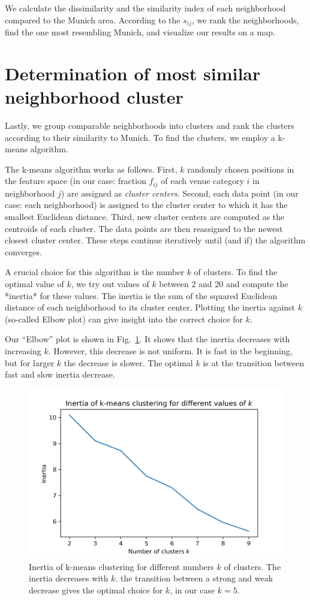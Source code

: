 \documentclass[UKenglish]{scrreprt}
\begin{document}
We calculate the dissimilarity and the similarity index of each neighborhood compared to the Munich area. According to the $s_{ij}$, we rank the neighborhoods, find the one most resembling Munich, and visualize our results on a map. 

\section{Determination of most similar neighborhood cluster}
\label{sec:Analysis:Cluster}
Lastly, we group comparable neighborhoods into clusters and rank the clusters according to their similarity to Munich. To find the clusters, we employ a k-means algorithm.

The k-means algorithm works as follows. First, $k$ randomly chosen positions in the feature space (in our case: fraction $f_{ij}$ of each venue category $i$ in neighborhood $j$) are assigned as \emph{cluster centers}. Second, each data point (in our case: each neighborhood) is assigned to the cluster center to which it has the smallest Euclidean distance. Third, new cluster centers are computed as the centroids of each cluster. The data points are then reassigned to the newest closest cluster center. These steps continue iteratively until (and if) the algorithm converges.

A crucial choice for this algorithm is the number $k$ of clusters. To find the optimal value of $k$, we try out values of $k$ between 2 and 20 and compute the *inertia* for these values. The inertia is the sum of the squared Euclidean distance of each neighborhood to its cluster center. Plotting the inertia against $k$ (so-called Elbow plot) can give insight into the correct choice for $k$. 

Our \enquote{Elbow} plot is shown in Fig.~\ref{fig:ellbow}. It shows that the inertia decreases with increasing $k$. However, this decrease is not uniform. It is fast in the beginning, but for larger $k$ the decrease is slower. The optimal $k$ is at the transition between fast and slow inertia decrease. 

\begin{figure}
	\centering
	\includegraphics[width=0.7\linewidth]{Figs/Ellbowplot}
	\caption{Inertia of k-means clustering for different numbers $k$ of clusters. The inertia decreases with $k$. the transition between a strong and weak decrease gives the optimal choice for $k$, in our case $k=5$.}
	\label{fig:ellbow}
\end{figure}
\end{document}

